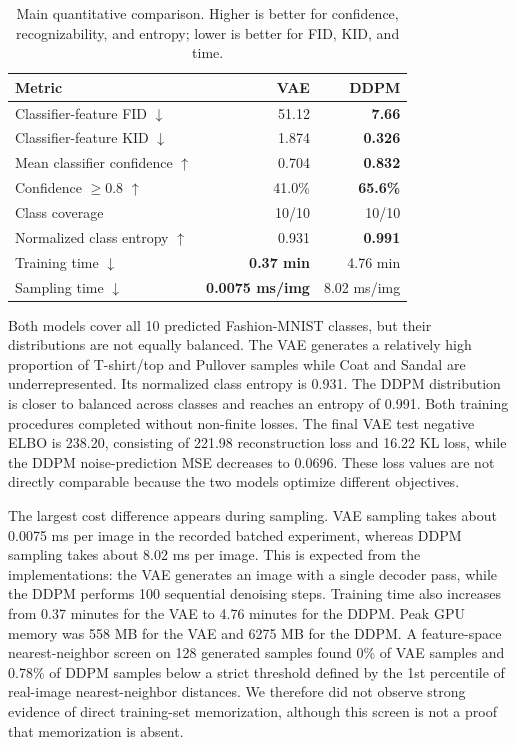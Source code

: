 \documentclass{article}
\begin{document}
\begin{table}[t]
\caption{Main quantitative comparison. Higher is better for confidence, recognizability, and entropy; lower is better for FID, KID, and time.}
\label{tab:results}
\centering
\small
\begin{tabular}{lrr}
\toprule
Metric & VAE & DDPM \\
\midrule
Classifier-feature FID $\downarrow$ & 51.12 & \textbf{7.66} \\
Classifier-feature KID $\downarrow$ & 1.874 & \textbf{0.326} \\
Mean classifier confidence $\uparrow$ & 0.704 & \textbf{0.832} \\
Confidence $\geq 0.8$ $\uparrow$ & 41.0\% & \textbf{65.6\%} \\
Class coverage & 10/10 & 10/10 \\
Normalized class entropy $\uparrow$ & 0.931 & \textbf{0.991} \\
Training time $\downarrow$ & \textbf{0.37 min} & 4.76 min \\
Sampling time $\downarrow$ & \textbf{0.0075 ms/img} & 8.02 ms/img \\
\bottomrule
\end{tabular}
\end{table}

Both models cover all 10 predicted Fashion-MNIST classes, but their distributions are not equally balanced. The VAE generates a relatively high proportion of T-shirt/top and Pullover samples while Coat and Sandal are underrepresented. Its normalized class entropy is 0.931. The DDPM distribution is closer to balanced across classes and reaches an entropy of 0.991. Both training procedures completed without non-finite losses. The final VAE test negative ELBO is 238.20, consisting of 221.98 reconstruction loss and 16.22 KL loss, while the DDPM noise-prediction MSE decreases to 0.0696. These loss values are not directly comparable because the two models optimize different objectives.

The largest cost difference appears during sampling. VAE sampling takes about 0.0075 ms per image in the recorded batched experiment, whereas DDPM sampling takes about 8.02 ms per image. This is expected from the implementations: the VAE generates an image with a single decoder pass, while the DDPM performs 100 sequential denoising steps. Training time also increases from 0.37 minutes for the VAE to 4.76 minutes for the DDPM. Peak GPU memory was 558 MB for the VAE and 6275 MB for the DDPM. A feature-space nearest-neighbor screen on 128 generated samples found 0\% of VAE samples and 0.78\% of DDPM samples below a strict threshold defined by the 1st percentile of real-image nearest-neighbor distances. We therefore did not observe strong evidence of direct training-set memorization, although this screen is not a proof that memorization is absent.
\end{document}

